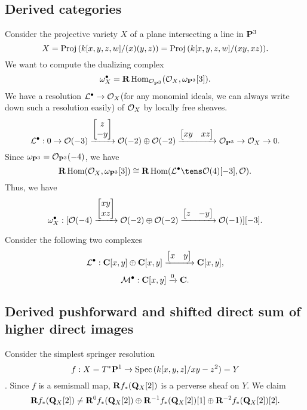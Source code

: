 \documentclass[../main.tex]{subfiles}
\begin{document}
\subsection{Derived categories}

\begin{example}
Consider the projective variety $X$ of a plane intersecting a line in $\P^{3}$
$$X=\Proj(k[x,y,z,w]/(x)(y,z))=\Proj(k[x,y,z,w]/(xy,xz)).$$
We want to compute the dualizing complex
$$\omega_{X}^{\bullet}=\dR\Hom_{\O_{\P^{3}}}(\O_{X},\omega_{\P^{3}}[3]).$$
We have a resolution $\L^{\bullet}\rightarrow \O_{X}$(for any monomial ideals, we can always write down such a resolution easily) of $\O_{X}$ by locally free sheaves. 
$$\L^{\bullet}:0\rightarrow \O(-3)\xrightarrow{ \begin{bmatrix}z \\ -y \end{bmatrix}}\O(-2)\oplus\O(-2)\xrightarrow{\begin{bmatrix}xy & xz \end{bmatrix}} \O_{\P^{3}} \rightarrow \O_{X}\rightarrow 0.$$
Since $\omega_{\P^{3}}=\O_{\P^{3}}(-4)$, we have 
$$\dR\Hom(\O_{X},\omega_{\P^{3}}[3])\cong \dR\Hom(\L^{\bullet}\tens\O(4)[-3],\O).$$
Thus, we have 
$$\omega_{X}^{\bullet}: [\O(-4)\xrightarrow {\begin{bmatrix}xy \\ xz \end{bmatrix}}\O(-2)\oplus\O(-2)\xrightarrow{\begin{bmatrix}z & -y \end{bmatrix}} \O(-1)][-3].$$
\end{example}


\begin{example}
Consider the following two complexes
$$\L^{\bullet}: \C[x,y]\oplus \C[x,y]\xrightarrow{\begin{bmatrix}x & y \end{bmatrix}} \C[x,y],$$
$$\M^{\bullet}:\C[x,y]\xrightarrow{0}\C.$$
\subsection{Derived pushforward and shifted direct sum of higher direct images}
Consider the simplest springer resolution 
$$f:X=T^{*}\P^{1}\rightarrow \Spec(k[x,y,z]/xy-z^{2})=Y$$. Since $f$ is a semismall map, $\dR f_{*}(\Q_{X}[2])$ is a perverse sheaf on $Y$.  
We claim 
$$\dR f_{*}(\Q_{X}[2])\neq \dR^{0}f_{*}(\Q_{X}[2])\oplus \dR^{-1}f_{*}(\Q_{X}[2])[1]\oplus \dR^{-2}f_{*}(\Q_{X}[2])[2].$$
\end{example}
\end{document}
